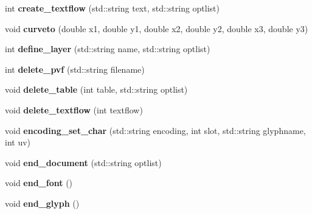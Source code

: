 \begin{DoxyCompactItemize}
\item 
\hypertarget{classPDFlib_a9b80d68d417defcc9547b007c61b8877}{int {\bfseries create\-\_\-textflow} (std\-::string text, std\-::string optlist)}\label{classPDFlib_a9b80d68d417defcc9547b007c61b8877}

\item 
\hypertarget{classPDFlib_ae331bf087034fdc7961fbc95db5479a6}{void {\bfseries curveto} (double x1, double y1, double x2, double y2, double x3, double y3)}\label{classPDFlib_ae331bf087034fdc7961fbc95db5479a6}

\item 
\hypertarget{classPDFlib_a9ee76ee9081c4ef79c378ad4ed62df58}{int {\bfseries define\-\_\-layer} (std\-::string name, std\-::string optlist)}\label{classPDFlib_a9ee76ee9081c4ef79c378ad4ed62df58}

\item 
\hypertarget{classPDFlib_a60c311c1176f37551fade62b15e260fa}{int {\bfseries delete\-\_\-pvf} (std\-::string filename)}\label{classPDFlib_a60c311c1176f37551fade62b15e260fa}

\item 
\hypertarget{classPDFlib_a87643d5d18be98c83ae636b6e3013e8f}{void {\bfseries delete\-\_\-table} (int table, std\-::string optlist)}\label{classPDFlib_a87643d5d18be98c83ae636b6e3013e8f}

\item 
\hypertarget{classPDFlib_ac4562f4944113165c37d27c3f2481412}{void {\bfseries delete\-\_\-textflow} (int textflow)}\label{classPDFlib_ac4562f4944113165c37d27c3f2481412}

\item 
\hypertarget{classPDFlib_a83ebfdf9ada3df0634b6748aa2d27eff}{void {\bfseries encoding\-\_\-set\-\_\-char} (std\-::string encoding, int slot, std\-::string glyphname, int uv)}\label{classPDFlib_a83ebfdf9ada3df0634b6748aa2d27eff}

\item 
\hypertarget{classPDFlib_aadbf95532d240e683aeda234624c7f61}{void {\bfseries end\-\_\-document} (std\-::string optlist)}\label{classPDFlib_aadbf95532d240e683aeda234624c7f61}

\item 
\hypertarget{classPDFlib_ad38e3338e0217a90ff322083b7d66843}{void {\bfseries end\-\_\-font} ()}\label{classPDFlib_ad38e3338e0217a90ff322083b7d66843}

\item 
\hypertarget{classPDFlib_a75da9905bdccda79115aa724a7aff2bd}{void {\bfseries end\-\_\-glyph} ()}\label{classPDFlib_a75da9905bdccda79115aa724a7aff2bd}


\end{DoxyCompactItemize}

